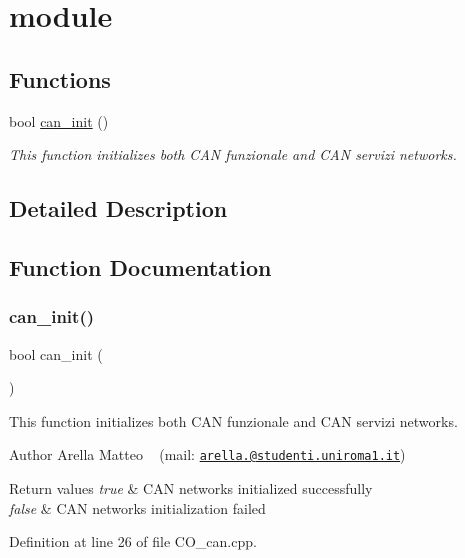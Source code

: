 \hypertarget{group___c_a_n}{}\section{module}
\label{group___c_a_n}
\subsection*{Functions}
\begin{DoxyCompactItemize}
\item 
bool \mbox{\hyperlink{group___c_a_n_ga36b6b5924eb84ef2e4c2bd548b28436f}{can\+\_\+init}} ()
\begin{DoxyCompactList}\small\item\em This function initializes both C\+AN funzionale and C\+AN servizi networks. \end{DoxyCompactList}\end{DoxyCompactItemize}


\subsection{Detailed Description}


\subsection{Function Documentation}
\mbox{\label{group___c_a_n_ga36b6b5924eb84ef2e4c2bd548b28436f}} 
\subsubsection{\texorpdfstring{can\+\_\+init()}{can\_init()}}
{\footnotesize\ttfamily bool can\+\_\+init (\begin{DoxyParamCaption}{ }\end{DoxyParamCaption})}



This function initializes both C\+AN funzionale and C\+AN servizi networks. 

\begin{DoxyAuthor}{Author}
Arella Matteo ~\newline
 (mail\+: \href{mailto:arella.1646983@studenti.uniroma1.it}{\tt arella.@studenti.\+uniroma1.\+it}) 
\end{DoxyAuthor}

\begin{DoxyRetVals}{Return values}
{\em true} & C\+AN networks initialized successfully \\
\hline
{\em false} & C\+AN networks initialization failed \\
\hline
\end{DoxyRetVals}


Definition at line 26 of file C\+O\+\_\+can.\+cpp.

